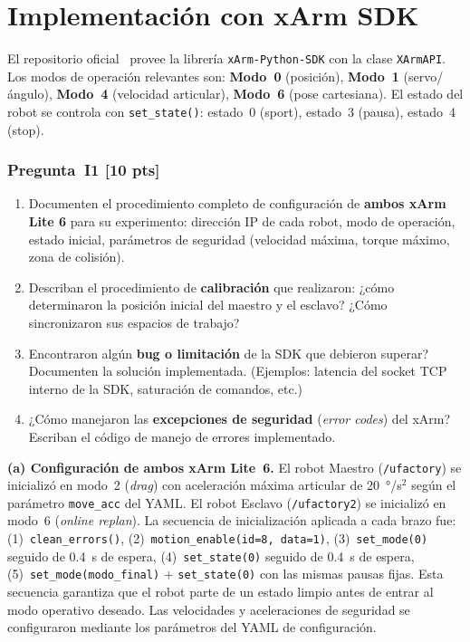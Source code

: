 \documentclass[journal,10pt,twoside]{IEEEtran}
\newcommand{\pts}[1]{\textbf{\color{tec_red}[#1 pts]}}
\begin{document}
\section{Implementación con xArm SDK}
\label{sec:implementation}

\begin{theorybox}
  El repositorio oficial~\cite{xarm_github} provee la librería
  \texttt{xArm-Python-SDK} con la clase \texttt{XArmAPI}.
  Los modos de operación relevantes son:
  \textbf{Modo~0} (posición), \textbf{Modo~1} (servo/ángulo),
  \textbf{Modo~4} (velocidad articular), \textbf{Modo~6} (pose cartesiana).
  El estado del robot se controla con \texttt{set\_state()}:
  estado~0 (sport), estado~3 (pausa), estado~4 (stop).
\end{theorybox}

\subsubsection*{Pregunta~I1 \pts{10}}
\begin{enumerate}[label=(\alph*)]
  \item Documenten el procedimiento completo de configuración de
        \textbf{ambos xArm Lite 6} para su experimento:
        dirección IP de cada robot, modo de operación, estado inicial,
        parámetros de seguridad (velocidad máxima, torque máximo,
        zona de colisión).
  \item Describan el procedimiento de \textbf{calibración} que realizaron:
        ¿cómo determinaron la posición inicial del maestro y el esclavo?
        ¿Cómo sincronizaron sus espacios de trabajo?
  \item Encontraron algún \textbf{bug o limitación} de la SDK que
        debieron superar? Documenten la solución implementada.
        (Ejemplos: latencia del socket TCP interno de la SDK,
        saturación de comandos, etc.)
  \item ¿Cómo manejaron las \textbf{excepciones de seguridad}
        (\textit{error codes}) del xArm? Escriban el código de
        manejo de errores implementado.
\end{enumerate}

\textbf{(a) Configuración de ambos xArm Lite~6.}
El robot Maestro (\texttt{/ufactory}) se inicializó en modo~2
(\textit{drag}) con aceleración máxima articular de 20~°/s$^2$
según el parámetro \texttt{move\_acc} del YAML. El robot Esclavo
(\texttt{/ufactory2}) se inicializó en modo~6
(\textit{online replan}). La secuencia de inicialización aplicada
a cada brazo fue:
(1)~\texttt{clean\_errors()},
(2)~\texttt{motion\_enable(id=8, data=1)},
(3)~\texttt{set\_mode(0)} seguido de 0.4~s de espera,
(4)~\texttt{set\_state(0)} seguido de 0.4~s de espera,
(5)~\texttt{set\_mode(modo\_final)} + \texttt{set\_state(0)}
con las mismas pausas fijas. Esta secuencia garantiza que el robot
parte de un estado limpio antes de entrar al modo operativo deseado.
Las velocidades y aceleraciones de seguridad se configuraron
mediante los parámetros del YAML de configuración.
\end{document}
